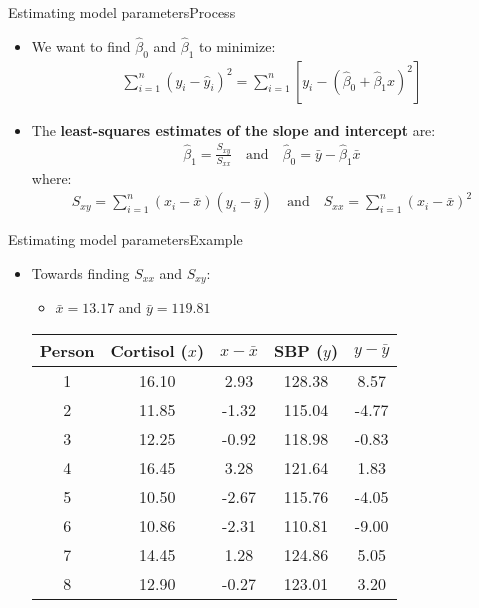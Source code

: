 \documentclass[xcolor=dvipsnames]{beamer}
\begin{document}
\begin{frame}{Estimating model parameters}{Process}
	\begin{itemize}
		\item We want to find $\hat{\beta}_0$ and $\hat{\beta}_1$ to minimize: \pause
		\begin{gather*}
			\sum_{i=1}^{n} \left(y_i - \hat{y}_i\right)^2 = \sum_{i=1}^{n} \left[y_i - \left(\hat{\beta}_0 + \hat{\beta}_1 x\right)^2\right]
		\end{gather*} \pause
		\item The \textbf{least-squares estimates of the slope and intercept} are: \pause
		\begin{gather*}
			\hat{\beta}_1 = \frac{S_{xy}}{S_{xx}}\quad \text{and} \quad \hat{\beta}_0 = \bar{y}-\hat{\beta}_1 \bar{x}
		\end{gather*}
		where:
		\begin{gather*}
			S_{xy} = \sum_{i=1}^{n}(x_i - \bar{x})(y_i - \bar{y}) \quad \text{and} \quad S_{xx} = \sum_{i=1}^{n}\left(x_i - \bar{x}\right)^2
		\end{gather*}
	\end{itemize}
\end{frame}

\begin{frame}{Estimating model parameters}{Example}
	\begin{itemize}
		\item Towards finding $S_{xx}$ and $S_{xy}$: \pause
		\begin{itemize}
			\item $\bar{x} = 13.17$ and $\bar{y} = 119.81$ \pause
		\end{itemize}
		\vspace{1mm}
		\begin{center}
			\begin{tabular}{ccccc}
				\hline
				Person & Cortisol ($x$) & $x-\bar{x}$ & SBP ($y$) & $y-\bar{y}$ \\ 
				\hline
				1 & 16.10 & 2.93 & 128.38  & 8.57\\ 
				2 & 11.85 & -1.32 & 115.04  & -4.77\\ 
				3 & 12.25 & -0.92 & 118.98  & -0.83\\ 
				4 & 16.45 & 3.28 & 121.64  & 1.83\\ 
				5 & 10.50 & -2.67 & 115.76  & -4.05\\ 
				6 & 10.86 & -2.31 & 110.81  & -9.00\\ 
				7 & 14.45 & 1.28 & 124.86  & 5.05\\ 
				8 & 12.90 & -0.27 & 123.01  & 3.20\\ 
				\hline
			\end{tabular}
		\end{center}
	\end{itemize}
\end{frame}
\end{document}
